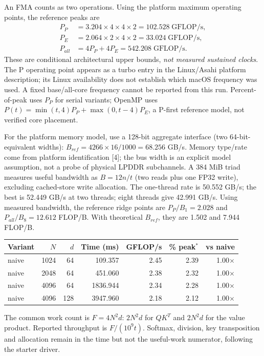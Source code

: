 \documentclass[10pt,a4paper]{article}
\newcommand{\question}[1]{\vspace{1mm}{\large\bfseries #1}\par\vspace{1mm}}
\begin{document}
An FMA counts as two operations. Using the platform maximum operating points, the reference peaks are
\begin{align*}
P_P&=3.204\times4\times4\times2=102.528\;\mathrm{GFLOP/s},\\
P_E&=2.064\times2\times4\times2=33.024\;\mathrm{GFLOP/s},\\
P_{all}&=4P_P+4P_E=542.208\;\mathrm{GFLOP/s}.
\end{align*}
These are conditional architectural upper bounds, \emph{not measured sustained clocks}. The
P operating point appears as a turbo entry in the Linux/Asahi platform description; its Linux
availability does not establish which macOS frequency was used. A fixed base/all-core frequency
cannot be reported from this run. Percent-of-peak uses $P_P$ for serial variants; OpenMP uses
$P(t)=\min(t,4)P_P+\max(0,t-4)P_E$, a P-first reference model, not verified core placement.

For the platform memory model, use a 128-bit aggregate interface (two 64-bit-equivalent widths):
$B_{ref}=4266\times16/1000=68.256$ GB/s. Memory type/rate come from platform
identification [4]; the bus width is an explicit model assumption, not a probe of physical
LPDDR subchannels. A 384 MiB triad measures useful bandwidth as $B=12n/t$ (two reads plus
one FP32 write), excluding cached-store write allocation. The one-thread rate is 50.552 GB/s;
the best is 52.449 GB/s at two threads; eight threads give 42.991 GB/s.
Using measured bandwidth, the reference ridge points are $P_P/B_1=2.028$ and
$P_{all}/B_8=12.612$ FLOP/B. With theoretical $B_{ref}$, they are
1.502 and 7.944 FLOP/B.
\newpage
\question{Q2. Naive baseline}
\begin{center}
\small
\begin{tabular}{lrrrrrr}
\toprule
Variant & $N$ & $d$ & Time (ms) & GFLOP/s & \% peak$^\ast$ & vs naive \\
\midrule
naive & 1024 & 64 & 109.357 & 2.45 & 2.39 & 1.00$\times$ \\
naive & 2048 & 64 & 451.060 & 2.38 & 2.32 & 1.00$\times$ \\
naive & 4096 & 64 & 1836.944 & 2.34 & 2.28 & 1.00$\times$ \\
naive & 4096 & 128 & 3947.960 & 2.18 & 2.12 & 1.00$\times$ \\
\bottomrule
\end{tabular}
\end{center}

The common work count is $F=4N^2d$: $2N^2d$ for $QK^T$ and $2N^2d$ for the value product.
Reported throughput is $F/(10^9t)$. Softmax, division, key transposition and allocation remain
in the time but not the useful-work numerator, following the starter driver.
\end{document}
